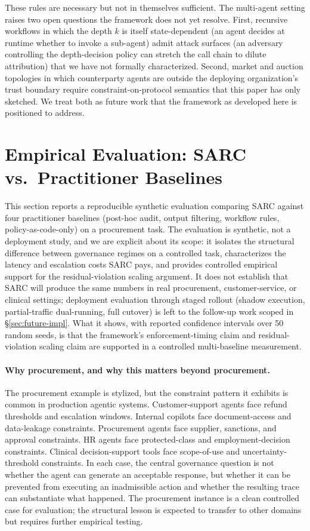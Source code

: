 \documentclass[11pt,a4paper]{article}
\theoremstyle{remark}
\begin{document}
These rules are necessary but not in themselves sufficient. The multi-agent setting raises two open questions the framework does not yet resolve. First, recursive workflows in which the depth $k$ is itself state-dependent (an agent decides at runtime whether to invoke a sub-agent) admit attack surfaces (an adversary controlling the depth-decision policy can stretch the call chain to dilute attribution) that we have not formally characterized. Second, market and auction topologies in which counterparty agents are outside the deploying organization's trust boundary require constraint-on-protocol semantics that this paper has only sketched. We treat both as future work that the framework as developed here is positioned to address.

\section{Empirical Evaluation: SARC vs.\ Practitioner Baselines}\label{sec:sim}

This section reports a reproducible synthetic evaluation comparing SARC against four practitioner baselines (post-hoc audit, output filtering, workflow rules, policy-as-code-only) on a procurement task. The evaluation is synthetic, not a deployment study, and we are explicit about its scope: it isolates the structural difference between governance regimes on a controlled task, characterizes the latency and escalation costs SARC pays, and provides controlled empirical support for the residual-violation scaling argument. It does not establish that SARC will produce the same numbers in real procurement, customer-service, or clinical settings; deployment evaluation through staged rollout (shadow execution, partial-traffic dual-running, full cutover) is left to the follow-up work scoped in \S\ref{sec:future-impl}. What it shows, with reported confidence intervals over 50 random seeds, is that the framework's enforcement-timing claim and residual-violation scaling claim are supported in a controlled multi-baseline measurement.

\paragraph{Why procurement, and why this matters beyond procurement.} The procurement example is stylized, but the constraint pattern it exhibits is common in production agentic systems. Customer-support agents face refund thresholds and escalation windows. Internal copilots face document-access and data-leakage constraints. Procurement agents face supplier, sanctions, and approval constraints. HR agents face protected-class and employment-decision constraints. Clinical decision-support tools face scope-of-use and uncertainty-threshold constraints. In each case, the central governance question is not whether the agent can generate an acceptable response, but whether it can be prevented from executing an inadmissible action and whether the resulting trace can substantiate what happened. The procurement instance is a clean controlled case for evaluation; the structural lesson is expected to transfer to other domains but requires further empirical testing.
\end{document}
